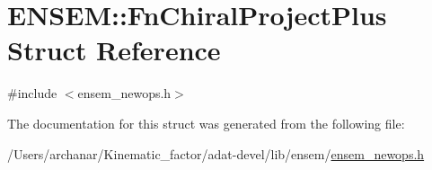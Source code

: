 \hypertarget{structENSEM_1_1FnChiralProjectPlus}{}\section{E\+N\+S\+EM\+:\+:Fn\+Chiral\+Project\+Plus Struct Reference}
\label{structENSEM_1_1FnChiralProjectPlus}


{\ttfamily \#include $<$ensem\+\_\+newops.\+h$>$}



The documentation for this struct was generated from the following file\+:\begin{DoxyCompactItemize}
\item 
/\+Users/archanar/\+Kinematic\+\_\+factor/adat-\/devel/lib/ensem/\mbox{\hyperlink{adat-devel_2lib_2ensem_2ensem__newops_8h}{ensem\+\_\+newops.\+h}}\end{DoxyCompactItemize}

